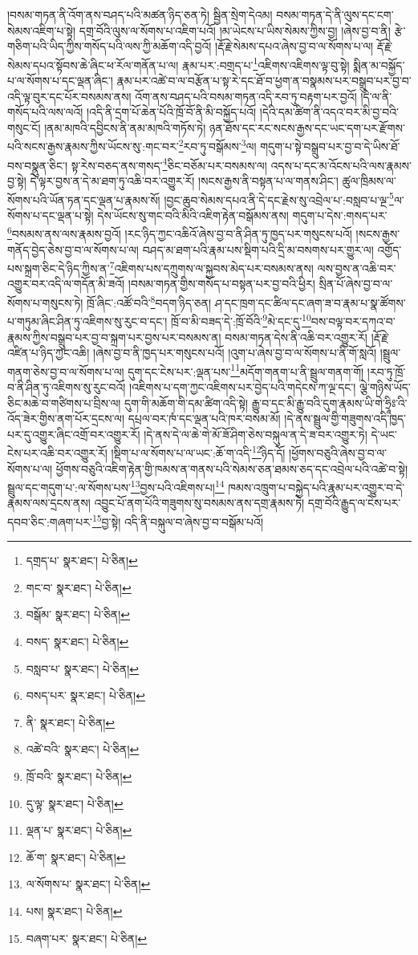 །བསམ་གཏན་ནི་འོག་ནས་བཤད་པའི་མཚན་ཉིད་ཅན་ཏེ། སྦྱིན་སྲེག་དེའམ། བསམ་གཏན་དེ་ནི་ལུས་དང་ངག་སེམས་འཇིག་པ་སྟེ། དགྲ་བོའི་ལུས་ལ་སོགས་པ་འཇིག་པའོ། །མ་ཡེངས་པ་ཡིས་སེམས་ཀྱིས་བྱ། །ཞེས་བྱ་བ་ནི། རྩེ་གཅིག་པའི་ཡིད་ཀྱིས་གསོད་པའི་ལས་ཀྱི་མཆོག་འདི་བྱའོ། །རྡོ་རྗེ་སེམས་དཔའ་ཞེས་བྱ་བ་ལ་སོགས་པ་ལ། རྡོ་རྗེ་སེམས་དཔའ་སྟོབས་ཆེ་ཞིང་ཕ་རོལ་གནོན་པ་ལ། རྣམ་པར་:བགྲད་པ་\footnote{དགྲད་པ་  སྣར་ཐང་།  པེ་ཅིན། }འཇིགས་འཇིགས་ལྟ་བུ་སྟེ། སྨིན་མ་བསྐྱོད་པ་ལ་སོགས་པ་དང་ལྡན་ཞིང་། རྣམ་པར་འཚེ་བ་ལ་བརྩོན་པ་སྟ་རེ་དང་ཐོ་བ་ཕྱག་ན་བསྣམས་པར་བསྒྲུབ་པར་བྱ་བ་འདི་ལྟ་བུར་དང་པོར་བསམས་ནས། འོག་ནས་བཤད་པའི་བསམ་གཏན་འདི་རབ་ཏུ་བརྟག་པར་བྱའོ། །དེ་ལ་ནི་གསོད་པའི་ལས་ལའོ། །འདི་ནི་དྲག་པོ་ཆེན་པོའི་ཁྲོ་བོ་ནི་མི་བསྐྱོད་པའོ། །དེའི་དམ་ཚིག་ནི་འདའ་བར་མི་བྱ་བའི་གསུང་ངོ། །ནམ་མཁའི་དབྱིངས་ནི་ནམ་མཁའི་གཏོས་ཏེ། ཉན་ཐོས་དང་རང་སངས་རྒྱས་དང་ཡང་དག་པར་རྫོགས་པའི་སངས་རྒྱས་རྣམས་ཀྱིས་ཡོངས་སུ་:གང་བར་\footnote{གང་བ་  སྣར་ཐང་།  པེ་ཅིན། }རབ་ཏུ་བསྒོམས་\footnote{བསྒོམ་  སྣར་ཐང་།  པེ་ཅིན། }ལ། གདུག་པ་སྟེ་བསྒྲུབ་པར་བྱ་བ་དེ་ཡིས་ཐོ་བས་བསྣུན་ཅིང་། སྟ་རེས་བཅད་ནས་གསད་\footnote{བསད་  སྣར་ཐང་།  པེ་ཅིན། }ཅིང་བཅོམ་པར་བསམས་ལ། འདས་པ་དང་མ་འོངས་པའི་ལས་རྣམས་བྱ་སྟེ། དེ་ལྟར་བྱས་ན་དེ་མ་ཐག་ཏུ་འཆི་བར་འགྱུར་རོ། །སངས་རྒྱས་ནི་བསྟན་པ་ལ་གནས་ཤིང་། ཚུལ་ཁྲིམས་ལ་སོགས་པའི་ཡོན་ཏན་དང་ལྡན་པ་རྣམས་སོ། །བྱང་ཆུབ་སེམས་དཔའ་ནི་དེ་དང་རྗེས་སུ་འབྲེལ་པ་:བསླབ་པ་ལྔ་\footnote{བསླབ་པ་  སྣར་ཐང་།  པེ་ཅིན། }ལ་སོགས་པ་དང་ལྡན་པ་སྟེ། དེས་ཡོངས་སུ་གང་བའི་མིའི་འཇིག་རྟེན་བསྒོམས་ནས། གདུག་པ་དེས་:གསད་པར་\footnote{བསད་པར་  སྣར་ཐང་།  པེ་ཅིན། }བསམས་ནས་ལས་རྣམས་བྱའོ། །རང་ཉིད་ཀྱང་འཆིའོ་ཞེས་བྱ་བ་ནི་ཤིན་ཏུ་ཁྱད་པར་གསུངས་པའོ། །སངས་རྒྱས་གནོད་བྱེད་ཅེས་བྱ་བ་ལ་སོགས་པ་ལ། བཤད་མ་ཐག་པའི་རྣམ་པས་སྡིག་པའི་དྲི་མ་བསགས་པར་གྱུར་ལ། འགྱོད་པས་སྐྲག་ཅིང་དེ་ཉིད་ཀྱིས་ན་\footnote{ནི་  སྣར་ཐང་།  པེ་ཅིན། }འཇིགས་པས་དཀྲུགས་ལ་སྐྱབས་མེད་པར་བསམས་ནས། ལས་བྱས་ན་འཆི་བར་འགྱུར་བར་འདི་ལ་གདོན་མི་ཟའོ། །བསམ་གཏན་གྱིས་གསོད་པ་བསྟན་པར་བྱ་བའི་ཕྱིར། སྲིན་པོ་ཞེས་བྱ་བ་ལ་སོགས་པ་གསུངས་ཏེ། ཁྲོ་ཞིང་:འཚོ་བའི་\footnote{འཚེ་བའི་  སྣར་ཐང་།  པེ་ཅིན། }བདག་ཉིད་ཅན། ཤ་དང་ཁྲག་དང་ཚིལ་དང་ཞག་ཟ་བ་རྣམ་པ་སྣ་ཚོགས་པ་གཏུམ་ཞིང་ཤིན་ཏུ་འཇིགས་སུ་རུང་བ་དང་། ཁྲོ་བ་མི་བཟད་དེ་:ཁྲོ་བོའི་\footnote{ཁྲོ་བའི་  སྣར་ཐང་།  པེ་ཅིན། }མེ་དང་དུ་\footnote{དུ་ལྟ་  སྣར་ཐང་།  པེ་ཅིན། }བས་བལྟ་བར་དཀའ་བ་རྣམས་ཀྱིས་བསྒྲུབ་པར་བྱ་བ་སྐྲག་པར་བྱས་པར་བསམས་ན། བསམ་གཏན་དེས་ནི་འཆི་བར་འགྱུར་རོ། །རྡོ་རྗེ་འཛིན་པ་ཉིད་ཀྱང་འཆི། །ཞེས་བྱ་བ་ནི་ཁྱད་པར་གསུངས་པའོ། །འུག་པ་ཞེས་བྱ་བ་ལ་སོགས་པ་ནི་གོ་སླའོ། །སྦྲུལ་གནག་ཅེས་བྱ་བ་ལ་སོགས་པ་ལ། དུག་དང་ངེས་པར་:ལྡན་པས་\footnote{ལྡན་པ་  སྣར་ཐང་།  པེ་ཅིན། }མདོག་གནག་པ་ནི་སྦྲུལ་གནག་གོ། །རབ་ཏུ་ཁྲོ་བ་ནི་ཤིན་ཏུ་འཇིགས་སུ་རུང་བའོ། །འཇིགས་པ་དག་ཀྱང་འཇིགས་པར་བྱེད་པའི་གདེངས་ཀ་ལྔ་དང་། ལྕེ་གཉིས་ཡོད་ཅིང་མཆེ་བ་གཙིགས་པ་བྲིས་ལ། དུག་གི་མཆོག་གི་དམ་ཚིག་འདི་སྟེ། རྒྱུ་བ་དང་མི་རྒྱུ་བའི་དུག་རྣམས་ཡི་གེ་ཧྲཱིཿ་འི་འོད་ཟེར་གྱིས་ནག་པོར་དྲངས་ལ། དཔྲལ་བར་ཁཾ་དང་ལྡན་པའི་ཁར་བསམ་མོ། །དེ་ནས་སྦྲུལ་གྱི་གཟུགས་འདི་ཁྱད་པར་དུ་འགྱུར་ཞིང་འགྲོ་བར་འགྱུར་རོ། །དེ་ནས་དེ་ལ་ཆེ་གེ་མོ་ཟོ་ཤིག་ཅེས་བསྐུལ་ན་དེ་ཟ་བར་འགྱུར་ཏེ། དེ་ཡང་ངེས་པར་འཆི་བར་འགྱུར་རོ། །སྡིག་པ་ལ་སོགས་པ་ལ་ཡང་:ཆོ་ག་འདི་\footnote{ཆོ་ག་  སྣར་ཐང་།  པེ་ཅིན། }ཉིད་དོ། །ཕྱོགས་བཅུའི་ཞེས་བྱ་བ་ལ་སོགས་པ་ལ། ཕྱོགས་བཅུའི་འཇིག་རྟེན་གྱི་ཁམས་ན་གནས་པའི་སེམས་ཅན་ཐམས་ཅད་དང་འབྲེལ་པའི་འཚེ་བ་སྟེ། སྦྲུལ་དང་གདུག་པ་:ལ་སོགས་པས་\footnote{ལ་སོགས་པ་  སྣར་ཐང་།  པེ་ཅིན། }བྱས་པའི་འཇིགས་པ།\footnote{པས།  སྣར་ཐང་།  པེ་ཅིན། } ཁམས་འཁྲུག་པ་བསྐྱེད་པའི་རྣམ་པར་འགྱུར་བ་དེ་རྣམས་ལས་དྲངས་ནས། འབྱུང་པོ་ནག་པོའི་གཟུགས་སུ་བསམས་ནས་དགྲ་རྣམས་ཏེ། དགྲ་བོའི་རྒྱུད་ལ་ངེས་པར་དབབ་ཅིང་:གཞག་པར་\footnote{བཞག་པར་  སྣར་ཐང་།  པེ་ཅིན། }བྱ་སྟེ། འདི་ནི་བསྐུལ་བ་ཞེས་བྱ་བ་བསྒོམ་པའོ། 
